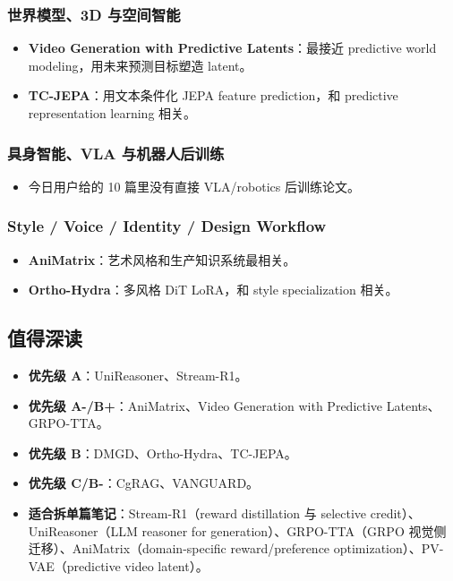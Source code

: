 \subsubsection{世界模型、3D 与空间智能}

\begin{itemize}[leftmargin=1.5em]
  \item \textbf{Video Generation with Predictive Latents}：最接近 predictive world modeling，用未来预测目标塑造 latent。
  \item \textbf{TC-JEPA}：用文本条件化 JEPA feature prediction，和 predictive representation learning 相关。
\end{itemize}

\subsubsection{具身智能、VLA 与机器人后训练}

\begin{itemize}[leftmargin=1.5em]
  \item 今日用户给的 10 篇里没有直接 VLA/robotics 后训练论文。
\end{itemize}

\subsubsection{Style / Voice / Identity / Design Workflow}

\begin{itemize}[leftmargin=1.5em]
  \item \textbf{AniMatrix}：艺术风格和生产知识系统最相关。
  \item \textbf{Ortho-Hydra}：多风格 DiT LoRA，和 style specialization 相关。
\end{itemize}

\subsection{值得深读}

\begin{itemize}[leftmargin=1.5em]
  \item \textbf{优先级 A}：UniReasoner、Stream-R1。
  \item \textbf{优先级 A-/B+}：AniMatrix、Video Generation with Predictive Latents、GRPO-TTA。
  \item \textbf{优先级 B}：DMGD、Ortho-Hydra、TC-JEPA。
  \item \textbf{优先级 C/B-}：CgRAG、VANGUARD。
  \item \textbf{适合拆单篇笔记}：Stream-R1（reward distillation 与 selective credit）、UniReasoner（LLM reasoner for generation）、GRPO-TTA（GRPO 视觉侧迁移）、AniMatrix（domain-specific reward/preference optimization）、PV-VAE（predictive video latent）。
\end{itemize}

